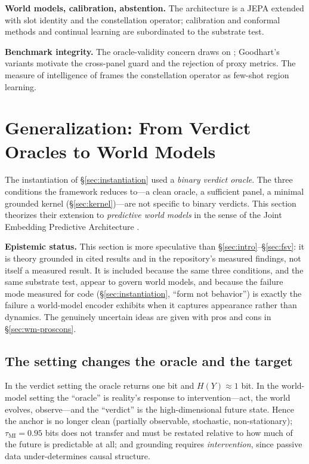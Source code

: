 \documentclass[10pt,twocolumn]{article}
\begin{document}
\textbf{World models, calibration, abstention.} The architecture is a JEPA
\citep{lecun2022path} extended with slot identity and the constellation operator;
calibration and conformal methods \citep{brier1950verification,
guo2017calibration, angelopoulos2021gentle} and continual learning
\citep{kirkpatrick2017overcoming} are subordinated to the substrate test.

\textbf{Benchmark integrity.} The oracle-validity concern draws on
\citep{jimenez2024swebench, aleithan2024swebenchplus, wang2025solved,
openai2026swebench}; Goodhart's variants \citep{manheim2018categorizing} motivate
the cross-panel guard and the rejection of proxy metrics. The measure of
intelligence of \citet{chollet2019measure} frames the constellation operator as
few-shot region learning.

\section{Generalization: From Verdict Oracles to World Models}
\label{sec:worldmodel}

The instantiation of \S\ref{sec:instantiation} used a \emph{binary verdict
oracle}. The three conditions the framework reduces to---a clean oracle, a
sufficient panel, a minimal grounded kernel (\S\ref{sec:kernel})---are not
specific to binary verdicts. This section theorizes their extension to
\emph{predictive world models} in the sense of the Joint Embedding Predictive
Architecture \citep{lecun2022path}.

\textbf{Epistemic status.} This section is more speculative than
\S\ref{sec:intro}--\S\ref{sec:fsv}: it is theory grounded in cited results and in
the repository's measured findings, not itself a measured result. It is included
because the same three conditions, and the same substrate test, appear to govern
world models, and because the failure mode measured for code
(\S\ref{sec:instantiation}, ``form not behavior'') is exactly the failure a
world-model encoder exhibits when it captures appearance rather than dynamics. The
genuinely uncertain ideas are given with pros and cons in
\S\ref{sec:wm-proscons}.

\subsection{The setting changes the oracle and the target}
In the verdict setting the oracle returns one bit and $H(Y)\approx1$ bit. In the
world-model setting the ``oracle'' is reality's response to intervention---act,
the world evolves, observe---and the ``verdict'' is the high-dimensional future
state. Hence the anchor is no longer clean (partially observable, stochastic,
non-stationary); $\tau_{\mathrm{MI}}=0.95$ bits does not transfer and must be
restated relative to how much of the future is predictable at all; and grounding
requires \emph{intervention}, since passive data under-determines causal structure.
\end{document}
